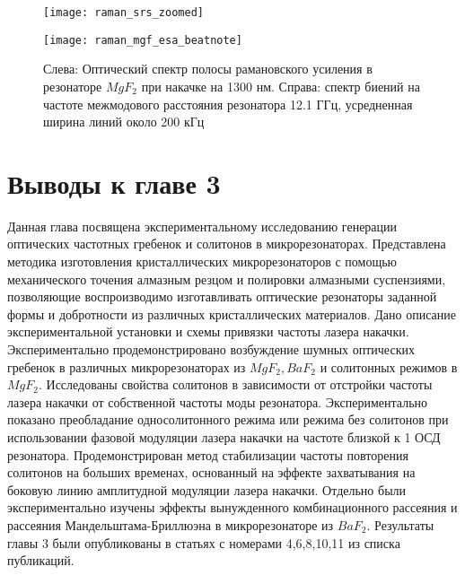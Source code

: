 \begin{figure}[ht]
\begin{minipage}[ht]{0.49\linewidth}\centering
    \texttt{[image: raman\_srs\_zoomed]}
  \end{minipage}
  \hfill
  \begin{minipage}[ht]{0.49\linewidth}\centering
    \texttt{[image: raman\_mgf\_esa\_beatnote]}
  \end{minipage}
    \caption{Слева: Оптический спектр полосы рамановского усиления в резонаторе $MgF_2$ при накачке на 1300 нм. Справа: спектр биений на частоте межмодового расстояния резонатора 12.1 ГГц, усредненная ширина линий около 200 кГц}
  \label{mgf_srs_beatnote}
\end{figure}

\section{Выводы к главе 3}
Данная глава посвящена экспериментальному исследованию генерации оптических частотных гребенок и солитонов в микрорезонаторах. Представлена методика изготовления кристаллических микрорезонаторов с помощью механического точения алмазным резцом и полировки алмазными суспензиями, позволяющие воспроизводимо изготавливать оптические резонаторы заданной формы и добротности из различных кристаллических материалов. Дано описание экспериментальной установки и схемы привязки частоты лазера накачки. Экспериментально продемонстрировано возбуждение шумных оптических гребенок в различных микрорезонаторах из $MgF_2, BaF_2$ и солитонных режимов в $MgF_2$. Исследованы свойства солитонов в зависимости от отстройки частоты лазера накачки от собственной частоты моды резонатора. Экспериментально показано преобладание односолитонного режима или режима без солитонов при использовании фазовой модуляции лазера накачки на частоте близкой к 1 ОСД резонатора. Продемонстрирован метод стабилизации частоты повторения солитонов на больших временах, основанный на эффекте захватывания на боковую линию амплитудной модуляции лазера накачки. Отдельно были экспериментально изучены эффекты вынужденного комбинационного рассеяния и рассеяния Мандельштама-Бриллюэна в микрорезонаторе из $BaF_2$. Результаты главы 3 были опубликованы в статьях с номерами 4,6,8,10,11 из списка публикаций.

